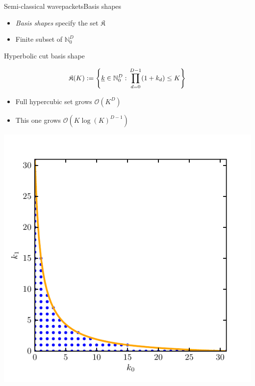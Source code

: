 \documentclass{beamer}
\begin{document}
\begin{frame}{Semi-classical wavepackets}{Basis shapes}
  \begin{itemize}
  \item \emph{Basis shapes} specify the set $\mathfrak{K}$
  \item Finite subset of $\mathbb{N}_0^D$
  \end{itemize}
  Hyperbolic cut basis shape
  \begin{minipage}{0.6\linewidth}
    \begin{equation*}
      \mathfrak{K}(K) := \left\{ \underline{k} \in \mathbb{N}_0^D :
        \, \prod_{d=0}^{D-1}(1+k_d) \leq K \right\}
    \end{equation*}
    \begin{itemize}
    \item Full hypercubic set grows $\mathcal{O}\left(K^D\right)$
    \item This one grows $\mathcal{O}\left(K \log(K)^{D-1}\right)$
    \end{itemize}
  \end{minipage}
  \begin{minipage}{0.29\linewidth}
    \begin{center}
      \includegraphics[scale=0.4]{./fig/hyperbolic_shape_2_32.pdf}
    \end{center}
  \end{minipage}
\end{frame}
\end{document}
